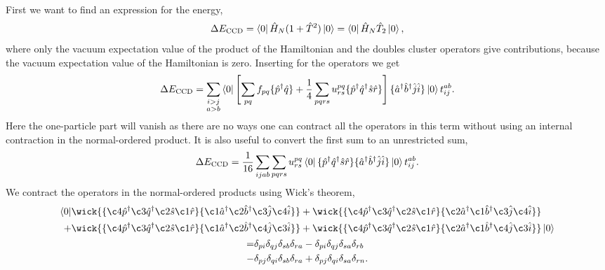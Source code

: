 First we want to find an expression for the energy,
\begin{equation}
    \Delta E_{\text{CCD}} = \bra{0}\hat{H}_N (1 + \hat{T}^2) \ket{0}
        = \bra{0} \hat{H}_N \hat{T}_2 \ket{0},
\end{equation}
where only the vacuum expectation value of the product of the Hamiltonian and the 
doubles cluster operators give contributions, because the vacuum expectation value
of the Hamiltonian is zero. Inserting for the operators we get
\begin{equation}
    \Delta E_{\text{CCD}} 
        = \sum_{\substack{i>j \\ a>b}}\bra{0}\left[ 
        \sum_{pq} f_{pq} \{\hat{p}^\dagger \hat{q}\}
        + \frac{1}{4}\sum_{pqrs} u^{pq}_{rs} \{\hat{p}^\dagger\hat{q}^\dagger\hat{s}\hat{r}\}
        \right] 
        \{\hat{a}^\dagger\hat{b}^\dagger\hat{j}\hat{i} \}
        \ket{0}t^{ab}_{ij}.
\end{equation}
Here the one-particle part will vanish as there are no ways one can contract all the
operators in this term without using an internal contraction in the normal-ordered
product. It is also useful to convert the first sum to an unrestricted sum,
\begin{equation}
    \Delta E_{\text{CCD}}
        = \frac{1}{16}\sum_{ijab}\sum_{pqrs} u^{pq}_{rs} 
           \bra{0} 
           \{\hat{p}^\dagger\hat{q}^\dagger\hat{s}\hat{r}\} 
           \{\hat{a}^\dagger\hat{b}^\dagger\hat{j}\hat{i} \}
           \ket{0} t^{ab}_{ij}.
\end{equation}
We contract the operators in the normal-ordered products using Wick's theorem,
\begin{gather}
    \begin{aligned}
         \bra{0}
            &\wick{
            \{\c4{\hat{p}}^\dagger \c3{\hat{q}}^\dagger \c2{\hat{s}} \c1{\hat{r}} \} 
            \{\c1{\hat{a}}^\dagger \c2{\hat{b}}^\dagger \c3{\hat{j}} \c4{\hat{i}} \} 
            }
            +
            \wick{
            \{\c4{\hat{p}}^\dagger \c3{\hat{q}}^\dagger \c2{\hat{s}} \c1{\hat{r}} \} 
            \{\c2{\hat{a}}^\dagger \c1{\hat{b}}^\dagger \c3{\hat{j}} \c4{\hat{i}} \}
            } \\
            +
            &\wick{
            \{\c4{\hat{p}}^\dagger \c3{\hat{q}}^\dagger \c2{\hat{s}} \c1{\hat{r}} \} 
            \{\c1{\hat{a}}^\dagger \c2{\hat{b}}^\dagger \c4{\hat{j}} \c3{\hat{i}} \}
            }
            +
            \wick{
            \{\c4{\hat{p}}^\dagger \c3{\hat{q}}^\dagger \c2{\hat{s}} \c1{\hat{r}} \} 
            \{\c2{\hat{a}}^\dagger \c1{\hat{b}}^\dagger \c4{\hat{j}} \c3{\hat{i}} \}
            }
         \ket{0}
    \end{aligned} \\
    \begin{aligned}
        = &\delta_{pi}\delta_{qj}\delta_{sb}\delta_{ra} 
        - \delta_{pi}\delta_{qj}\delta_{sa}\delta_{rb} \\
        - &\delta_{pj}\delta_{qi}\delta_{sb}\delta_{ra} 
        + \delta_{pj}\delta_{qi}\delta_{sa}\delta_{rn}. 
    \end{aligned} 
\end{gather}
